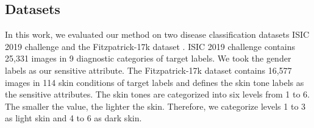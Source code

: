 \subsection{Datasets}

In this work, we evaluated our method on two disease classification datasets ISIC 2019 challenge \cite{Combalia2019BCN20000DL} \cite{Tschandl2018TheHD} and the Fitzpatrick-17k dataset \cite{Groh2021EvaluatingDN} . ISIC 2019 challenge contains 25,331 images in 9 diagnostic categories of target labels. We took the gender labels as our sensitive attribute.
The Fitzpatrick-17k dataset contains 16,577 images in 114 skin conditions of target labels and defines the skin tone labels as the sensitive attributes. The skin tones are categorized into six levels from 1 to 6. The smaller the value, the lighter the skin. Therefore, we categorize levels 1 to 3 as light skin and 4 to 6 as dark skin. 

